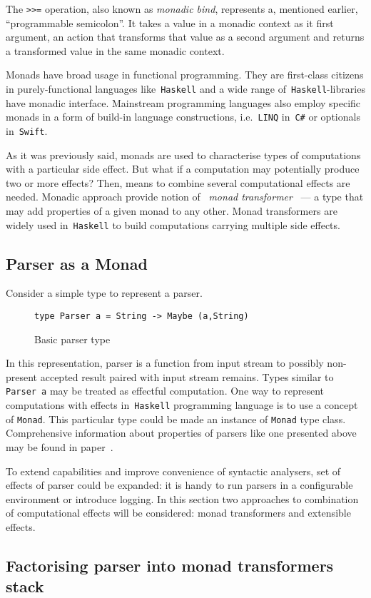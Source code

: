       The \lstinline{>>=} operation, also known as \emph{monadic bind}, represents
      a, mentioned earlier, ``programmable semicolon''. It takes a value in a monadic context as it first argument, an action that transforms that value as a second argument and returns a transformed value in the same monadic context.

      Monads have broad usage in functional programming. They are first-class citizens
      in purely-functional languages like~\texttt{Haskell} and a wide range of~\texttt{Haskell}-libraries have monadic interface. Mainstream programming languages also
      employ specific monads in a form of build-in language constructions,
      i.e.~\texttt{LINQ} in~\texttt{C\#} or optionals in~\texttt{Swift}.

      As it was previously said, monads are used to characterise types of computations with a particular side effect. But what if a computation may
      potentially produce two or more effects? Then, means to combine several
      computational effects are needed. Monadic approach provide notion of
      ~\emph{monad transformer}~\cite{Liang:1995:MTM:199448.199528} --- a type that
      may add properties of a given monad to any other. Monad transformers are widely
      used in~\texttt{Haskell} to build computations carrying multiple side effects.


    \subsection{Parser as a Monad}

      Consider a simple type to represent a parser.

      \begin{figure}[h]
      \begin{lstlisting}
type Parser a = String -> Maybe (a,String)
      \end{lstlisting}
      \caption{Basic parser type}
      \label{listing:maybeParser}
      \end{figure}

      In this representation, parser is a
      function from input stream to possibly non-present accepted result paired
      with input stream remains.
      Types similar to \texttt{Parser a} may be treated as effectful computation.
      One way to represent computations with effects in~\texttt{Haskell}
      programming language is to use a concept of \texttt{Monad}. This particular
      type could be made an instance of \texttt{Monad} type class.
      Comprehensive information about properties of parsers like one presented
      above may be found in paper~\cite{monParsing}.

      To extend capabilities and improve convenience of syntactic analysers, set of
      effects of parser could be expanded: it is handy to run parsers in a configurable
      environment or introduce logging. In this section two approaches to combination
      of computational effects will be considered: monad transformers and extensible
      effects.

    \subsection{Factorising parser into monad transformers stack}
